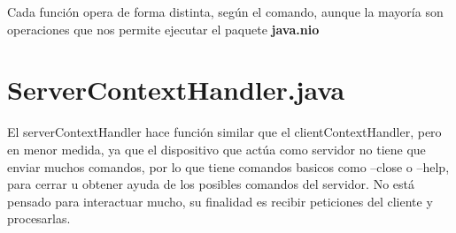 \documentclass[a4paper, 12pt]{report}
\begin{document}
Cada función opera de forma distinta, según el comando, aunque la mayoría son operaciones que nos permite ejecutar el paquete \textbf{java.nio}

\section{ServerContextHandler.java}

El serverContextHandler hace función similar que el clientContextHandler, pero en menor medida, ya que el
dispositivo que actúa como servidor no tiene que enviar muchos comandos, por lo que tiene comandos basicos como
--close o --help, para cerrar u obtener ayuda de los posibles comandos del servidor. No está pensado para interactuar mucho, su finalidad es recibir peticiones del cliente y procesarlas.

\printbibliography
\end{document}
